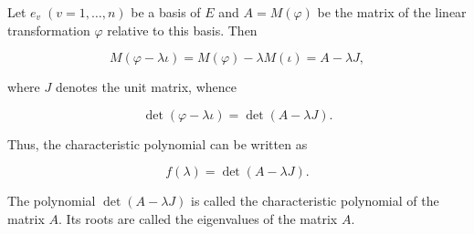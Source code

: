 Let $e_v\;(v = 1, \ldots, n)$ be a basis of $E$ and $A = M(\varphi)$ be the matrix of the linear transformation $\varphi$ relative to this basis. Then

$$M(\varphi - \lambda \iota) = M(\varphi) - \lambda M(\iota) = A - \lambda J,$$

where $J$ denotes the unit matrix, whence

$$\det(\varphi - \lambda \iota) = \det(A - \lambda J).$$

Thus, the characteristic polynomial can be written as

$$f(\lambda) = \det(A - \lambda J).$$

The polynomial $\det(A - \lambda J)$ is called the characteristic polynomial of the matrix $A$. Its roots are called the eigenvalues of the matrix $A$.
